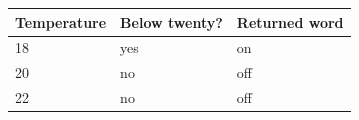 \begin{center}\begin{tabular}{lll}\toprule
Temperature & Below twenty? & Returned word \\\midrule
18 & yes & on \\
20 & no & off \\
22 & no & off \\\bottomrule
\end{tabular}\end{center}
